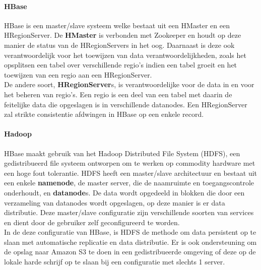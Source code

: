 \paragraph{HBase\cite{george2011hbase}} HBase is een master/slave systeem welke bestaat uit een HMaster en een HRegionServer. De \textbf{HMaster} is verbonden met Zookeeper en houdt op deze manier de status van de HRegionServers in het oog. Daarnaast is deze ook verantwoordelijk voor het toewijzen van data verantwoordelijkheden, zoals het opsplitsen een tabel over verschillende regio's indien een tabel groeit en het toewijzen van een regio aan een HRegionServer.\\
De andere soort, \textbf{HRegionServer}s, is verantwoordelijke voor de data in en voor het beheren van regio's. Een regio is een deel van een tabel met daarin de feitelijke data die opgeslagen is in verschillende datanodes. Een HRegionServer zal strikte consistentie afdwingen in HBase op een enkele record.  

\paragraph{Hadoop\cite{borthakur2007hadoop}} HBase maakt gebruik van het Hadoop Distributed File System (HDFS), een gedistribueerd file systeem ontworpen om te werken op commodity hardware met een hoge fout tolerantie. HDFS heeft een master/slave architectuur en bestaat uit een enkele \textbf{namenode}, de master server, die de naamruimte en toegangscontrole onderhoudt, en \textbf{datanode}s. De data wordt opgedeeld in blokken die door een verzameling van datanodes wordt opgeslagen, op deze manier is er data distributie. Deze master/slave configuratie zijn verschillende soorten van services en dient door de gebruiker zelf geconfigureerd te worden. \\
In de deze configuratie van HBase, is HDFS de methode om data persistent op te slaan met automatische replicatie en data distributie. Er is ook ondersteuning om de opslag naar Amazon S3 te doen in een gedistribueerde omgeving of deze op de lokale harde schrijf op te slaan bij een configuratie met slechts 1 server.\cite{george2011hbase}

